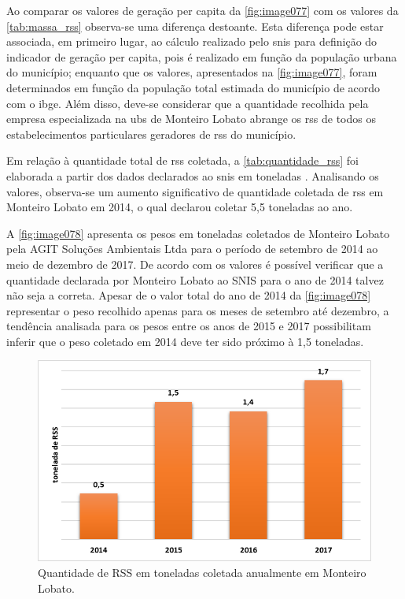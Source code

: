 	
	Ao comparar os valores de geração per capita da \autoref{fig:image077} com os valores da \autoref{tab:massa_rss} observa-se uma diferença destoante. Esta diferença pode estar associada, em primeiro lugar, ao cálculo realizado pelo \gls{snis} para definição do indicador de geração per capita, pois é realizado em função da população urbana do município; enquanto que os valores, apresentados na \autoref{fig:image077}, foram determinados em função da população total estimada do município de acordo com o \gls{ibge}. Além disso, deve-se considerar que a quantidade recolhida pela empresa especializada na \gls{ubs} de Monteiro Lobato abrange os \gls{rss} de todos os estabelecimentos particulares geradores de \gls{rss} do município. 
	
	Em relação à quantidade total de \gls{rss} coletada, a \autoref{tab:quantidade_rss} foi elaborada a partir dos dados declarados ao \gls{snis} em toneladas \cite{SNIS2016}. Analisando os valores, observa-se um aumento significativo de quantidade coletada de \gls{rss} em Monteiro Lobato em 2014, o qual declarou coletar 5,5 toneladas ao ano.

	
	
	
	A \autoref{fig:image078} apresenta os pesos em toneladas coletados de Monteiro Lobato pela AGIT Soluções Ambientais Ltda para o período de setembro de 2014 ao meio de dezembro de 2017. De acordo com os valores é possível verificar que a quantidade declarada por Monteiro Lobato ao SNIS para o ano de 2014 talvez não seja a correta. Apesar de o valor total do ano de 2014 da \autoref{fig:image078} representar o peso recolhido apenas para os meses de setembro até dezembro, a tendência analisada para os pesos entre os anos de 2015 e 2017 possibilitam inferir que o peso coletado em 2014 deve ter sido próximo à 1,5 toneladas.
	
	\begin{figure}
		\centering
		\includegraphics[width=0.75\linewidth]{produtos/prodtres/image078}
		\caption{Quantidade de RSS em toneladas coletada anualmente em Monteiro Lobato.}
		\label{fig:image078}
	\end{figure}
	
